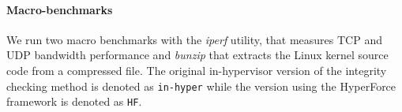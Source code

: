 %

\paragraph{Macro-benchmarks} \label{macrobench}
We run two macro benchmarks with the \emph{iperf} utility, that measures TCP and UDP bandwidth performance and \emph{bunzip} that extracts the Linux kernel source code from a compressed file. The original in-hypervisor version of the integrity checking method is denoted as \texttt{in-hyper} while the version using the HyperForce framework is denoted as \texttt{HF}.

